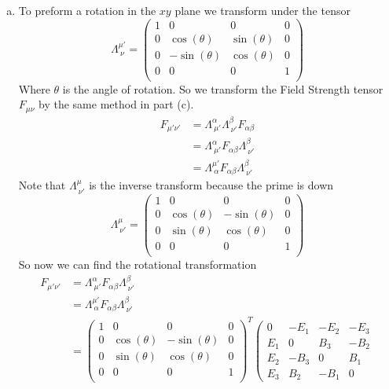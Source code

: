 \documentclass[11pt]{article}
\numberwithin{equation}{section}
\begin{document}
\begin{enumerate}[(a)]
\item
To preform a rotation in the $xy$ plane we transform under the tensor
$$\Lambda^{\mu'}_{\ \nu} = \left(\begin{array}{cccc}
		1	&0	&0	&0\\
		0	&\cos(\theta)	&\sin(\theta)	&0\\
		0	&-\sin(\theta)	&\cos(\theta)	&0\\
		0	&0	&0	&1\\
			\end{array}\right)$$
Where $\theta$ is the angle of rotation. So we transform the Field Strength tensor $F_{\mu\nu}$ by the same method in part (c).
\begin{align*}
F_{\mu'\nu'} &= \Lambda^{\alpha}_{\ \mu'}\Lambda^{\beta}_{\ \nu'}F_{\alpha \beta}\\
&= \Lambda^{\alpha}_{\ \mu'}F_{\alpha \beta}\Lambda^{\beta}_{\ \nu'}\\
&= \Lambda^{\mu'}_{\ \alpha}F_{\alpha \beta}\Lambda^{\beta}_{\ \nu'}
\end{align*}
Note that $\Lambda^{\mu}_{\ \nu'}$ is the inverse transform because the prime is down 
$$\Lambda^{\mu}_{\ \nu'} = \left(\begin{array}{cccc}
		1	&0	&0	&0\\
		0	&\cos(\theta)	&-\sin(\theta)	&0\\
		0	&\sin(\theta)	&\cos(\theta)	&0\\
		0	&0	&0	&1\\
			\end{array}\right)$$
So now we can find the rotational transformation 
\begin{align*}
F_{\mu'\nu'} &=  \Lambda^{\alpha}_{\ \mu'}F_{\alpha \beta}\Lambda^{\beta}_{\ \nu'}\\
&= \Lambda^{\mu'}_{\ \alpha}F_{\alpha \beta}\Lambda^{\beta}_{\ \nu'}\\
&= 		\left(\begin{array}{cccc}
		1	&0	&0	&0\\
		0	&\cos(\theta)	&-\sin(\theta)	&0\\
		0	&\sin(\theta)	&\cos(\theta)	&0\\
		0	&0	&0	&1\\
			\end{array}\right)^T
		\left(\begin{array}{cccc}
		0 &-E_1 &-E_2 &-E_3\\
		E_1 &0 &B_3 &-B_2\\
		E_2 &-B_3 &0 &B_1\\
		E_3 &B_2 &-B_1 &0

\end{array}
\end{align*}
\end{enumerate}
\end{document}
